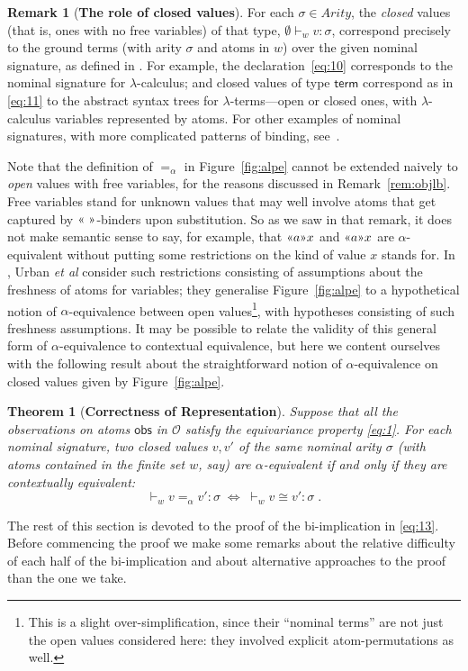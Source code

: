 \documentclass{LMCS}
\theoremstyle{plain}
\newtheorem{theorem}[thm]{Theorem}
\theoremstyle{definition}
\newtheorem{remark}[thm]{Remark}
\newcommand{\aeq}{=_{\alpha}}
\newcommand{\ar}[1][\sigma]{#1}
\newcommand{\Arity}{\mathit{Arity}}
\newcommand{\atm}[1][a]{#1}
\newcommand{\bimp}{\Leftrightarrow}
\newcommand{\BINDVAL}[2]{\mathopen{\text{\normalfont\guillemotleft}}#1
  \mathclose{\text{\normalfont\guillemotright}}#2}
\newcommand{\ent}{\vdash}
\newcommand{\kw}[1]{\mathsf{#1}}
\newcommand{\Obs}{\mathcal{O}}
\newcommand{\OBS}[1][obs]{\kw{#1}}
\newcommand{\ofty}{:}
\newcommand{\opeq}{\cong}
\newcommand{\TERM}{\kw{term}}
\newcommand{\val}[1][v]{#1}
\newcommand{\vid}[1][x]{#1}
\newcommand{\w}[1][w]{#1}
\begin{document}
\begin{remark}[\textbf{The role of closed values}]
  \label{rem:clov}
  For each $\ar\in\Arity$, the \emph{closed} values (that is, ones
  with no free variables) of that type, $\emptyset\ent_{\w}
  \val\ofty\ar$, correspond precisely to the ground terms (with arity
  $\ar$ and atoms in $\w$) over the given nominal signature, as
  defined in \cite{PittsAM:nomu-jv}. For example, the
  declaration~\eqref{eq:10} corresponds to the nominal signature for
  $\lambda$-calculus; and closed values of type $\TERM$ correspond as
  in \eqref{eq:11} to the abstract syntax trees for
  $\lambda$-terms---open or closed ones, with $\lambda$-calculus
  variables represented by atoms. For other examples of nominal
  signatures, with more complicated patterns of binding,
  see~\cite[Section~2.2]{PittsAM:alpsri}.

  Note that the definition of $\aeq$ in Figure~\ref{fig:alpe} cannot
  be extended naively to \emph{open} values with free variables, for
  the reasons discussed in Remark~\ref{rem:objlb}. Free variables
  stand for unknown values that may well involve atoms that get
  captured by $\BINDVAL{\ }{}$-binders upon substitution. So as we saw
  in that remark, it does not make semantic sense to say, for example,
  that $\BINDVAL{\atm}{\vid}$ and $\BINDVAL{\atm}{\vid}$ are
  $\alpha$-equivalent without putting some restrictions on the kind of
  value $\vid$ stands for. In \cite{PittsAM:nomu-jv}, Urban \emph{et
    al} consider such restrictions consisting of assumptions about the
  freshness of atoms for variables; they generalise
  Figure~\ref{fig:alpe} to a hypothetical notion of
  $\alpha$-equivalence between open values\footnote{This is a slight
    over-simplification, since their ``nominal terms'' are not just the
    open values considered here: they involved explicit
    atom-permutations as well.}, with hypotheses consisting of such
  freshness assumptions. It may be possible to relate the validity of
  this general form of $\alpha$-equivalence to contextual equivalence,
  but here we content ourselves with the following result about the
  straightforward notion of $\alpha$-equivalence on closed values
  given by Figure~\ref{fig:alpe}.
\end{remark}

\begin{theorem}[\textbf{Correctness of Representation}]
  \label{thm:corr}
  Suppose that all the observations on atoms $\OBS$ in $\Obs$ satisfy
  the equivariance property \eqref{eq:1}. For each nominal signature,
  two closed values $\val,\val'$ of the same nominal arity $\ar$ (with
  atoms contained in the finite set $\w$, say) are $\alpha$-equivalent
  if and only if they are contextually equivalent:
  \begin{equation}
    \label{eq:13}
    {}\ent_{\w} \val\aeq\val'\ofty \ar \;\bimp\; 
    {}\ent_{\w} \val \opeq\val'\ofty\ar\;.
  \end{equation}
\end{theorem}
The rest of this section is devoted to the proof of the bi-implication
in \eqref{eq:13}. Before commencing the proof we make some remarks
about the relative difficulty of each half of the bi-implication and
about alternative approaches to the proof than the one we take.
\end{document}
